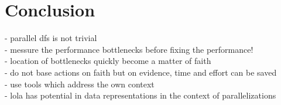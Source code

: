 \chapter{Conclusion}
- parallel dfs is not trivial\\
- messure the performance bottlenecks before fixing the performance!\\
- location of bottlenecks quickly become a matter of faith \\
- do not base actions on faith but on evidence, time and effort can be saved\\
- use tools which address the own context\\
- lola has potential in data representations in the context of parallelizations\\